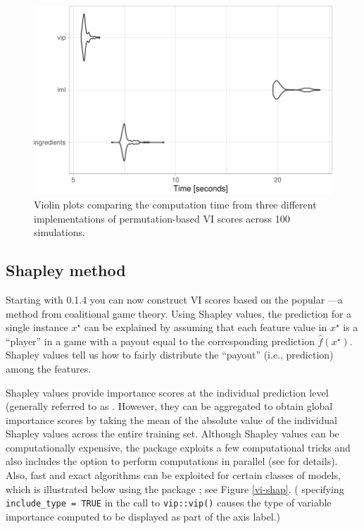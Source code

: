 \begin{Schunk}
\begin{figure}[!htb]

{\centering \includegraphics[width=0.7\linewidth]{greenwell-boehmke_files/figure-latex/benchmark-1} 

}

\caption[Violin plots comparing the computation time from three different implementations of permutation-based VI scores across 100 simulations]{Violin plots comparing the computation time from three different implementations of permutation-based VI scores across 100 simulations.}\label{fig:benchmark}
\end{figure}
\end{Schunk}

\subsection{Shapley method}

Starting with  0.1.4 you can now construct VI scores based on
the popular  \citet[sec. 5.9]{molnar-2019-iml}---a
method from coalitional game theory. Using Shapley values, the
prediction for a single instance \(x^\star\) can be explained by
assuming that each feature value in \(x^\star\) is a ``player'' in a
game with a payout equal to the corresponding prediction
\(\widehat{f}\left(x^\star\right)\). Shapley values tell us how to
fairly distribute the ``payout'' (i.e., prediction) among the features.

Shapley values provide importance scores at the individual prediction
level (generally referred to as . However,
they can be aggregated to obtain global importance scores by taking the
mean of the absolute value of the individual Shapley values across the
entire training set. Although Shapley values can be computationally
expensive, the  package \citep{R-fastshap} exploits a
few computational tricks and also includes the option to perform
computations in parallel (see  for details).
Also, fast and exact algorithms \citep{lundberg-explainable-2019} can be
exploited for certain classes of models, which is illustrated below
using the  package \citep{R-xgboost}; see Figure
\ref{vi-shap}. ( specifying
\texttt{include\_type\ =\ TRUE} in the call to \texttt{vip::vip()}
causes the type of variable importance computed to be displayed as part
of the axis label.)

